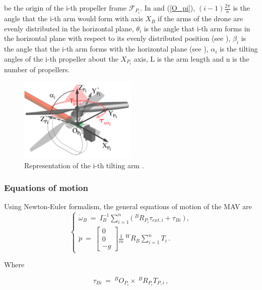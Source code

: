 be the origin of the i-th propeller frame  $\mathcal{F}_{P_{i}}$.
In  and (\ref{O_pi}), $(i-1)\frac{2\pi}{n}$ is the angle that
the i-th arm would form with axis $X_B$ if the arms of the drone are evenly
distributed in the horizontal plane, $\theta_i$ is the angle that i-th arm forms
in the horizontal plane with respect to its evenly distributed position
(see ), $\beta_i$ is the angle that the i-th arm forms with
the horizontal plane (see ), $\alpha_{i}$ is the tilting
angles of the i-th propeller about the $X_{P_{i}}$ axis, L is the arm length and
n is the number of propellers.

\begin{figure}[h]
  \centering
  \includegraphics[width=0.5\textwidth]{images/tilt_model.png}
  \caption{Representation of the i-th tilting arm \citep{ryll_modeling_2012}.}
  \label{fig:tilt_model}
\end{figure}

\subsubsection{Equations of motion}
\label{sec:equations}
Using Newton-Euler formalism, the general equations of motion of the MAV are
\begin{equation}
  \label{acc_eq}
  \begin{cases}
    \dot{\omega}_B  \ = \ I_B^{-1} \sum_{i=1}^{n}  \big(\ ^{B}R_{P_{i}} \tau_{ext,i} + \tau_{Bi} \ \big) \, ,\\
    \ddot{p}  \ = \
    \begin{bmatrix}
      0 \\
      0 \\
      -g
    \end{bmatrix}
    \frac{1}{m} \ ^{W}R_B \sum_{i=1}^{n} T_i \, .
  \end{cases}
\end{equation}

Where

\begin{equation}
  \label{tau_b_i}
  \tau_{Bi}  \ = \ ^{B}O_{P_{i}} \times\   ^{B}R_{P_{i}} T_{P,i}\, ,
\end{equation}

